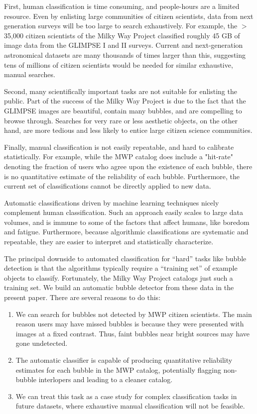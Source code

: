 \documentclass[preprint]{aastex}
\begin{document}
First, human classification is time consuming, and people-hours are a limited resource. Even by enlisting large communities of citizen scientists, data from next generation surveys will be too large to search exhaustively. For example, the $>$ 35,000 citizen scientists of the Milky Way Project classified roughly 45 GB of image data from the GLIMPSE I and II surveys. Current and next-generation astronomical datasets are many thousands of times larger than this, suggesting tens of millions of citizen scientists would be needed for similar exhaustive, manual searches.

Second, many scientifically important tasks are not suitable for enlisting the public. Part of the success of the Milky Way Project is due to the fact that the GLIMPSE images are beautiful, contain many bubbles, and are compelling to browse through. Searches for very rare or less aesthetic objects, on the other hand, are more tedious and less likely to entice large citizen science communities. 

Finally, manual classification is not easily repeatable, and hard to calibrate statistically. For example, while the MWP catalog does include a "hit-rate" denoting the fraction of users who agree upon the existence of each bubble, there is no quantitative estimate of the reliability of each bubble. Furthermore, the current set of classifications cannot be directly applied to new data.

Automatic classifications driven by machine learning techniques nicely complement human classification. Such an approach easily scales to large data volumes, and is immune to some of the factors that affect humans, like boredom and fatigue. Furthermore, because algorithmic classifications are systematic and repeatable, they are easier to interpret and statistically characterize. 

The principal downside to automated classification for ``hard'' tasks like bubble detection is that the algorithms typically require a ``training set'' of example objects to classify. Fortunately, the Milky Way Project catalogs just such a training set. We build an automatic bubble detector from these data in the present paper. There are several reasons to do this:

\begin{enumerate}
\item We can search for bubbles not detected by MWP citizen scientists. The main reason users may have missed bubbles is because they were presented with images at a fixed contrast. Thus, faint bubbles near bright sources may have gone undetected.

\item The automatic classifier is capable of producing quantitative reliability estimates for each bubble in the MWP catalog, potentially flagging non-bubble interlopers and leading to a cleaner catalog.

\item We can treat this task as a case study for complex classification tasks in future datasets, where exhaustive manual classification will not be feasible.

\end{enumerate}
\end{document}
